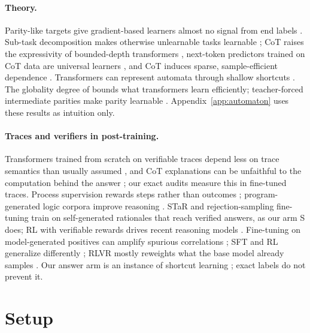 \documentclass{article}
\theoremstyle{definition}
\begin{document}
\paragraph{Theory.} Parity-like targets give gradient-based learners almost no signal from end labels \citep{shalevshwartz2017failures}. Sub-task decomposition makes otherwise unlearnable tasks learnable \citep{wies2023subtask}; CoT raises the expressivity of bounded-depth transformers \citep{feng2023towards,li2024chain,merrill2024expressive}, next-token predictors trained on CoT data are universal learners \citep{malach2024autoregressive}, and CoT induces sparse, sample-efficient dependence \citep{wen2025sparse}. Transformers can represent automata through shallow shortcuts \citep{liu2023shortcuts}. The globality degree of \citet{abbe2024far} bounds what transformers learn efficiently; teacher-forced intermediate parities make parity learnable \citep{kim2025parity}. Appendix~\ref{app:automaton} uses these results as intuition only.

\paragraph{Traces and verifiers in post-training.} Transformers trained from scratch on verifiable traces depend less on trace semantics than usually assumed \citep{valmeekam2026beyond}, and CoT explanations can be unfaithful to the computation behind the answer \citep{turpin2023unfaithful}; our exact audits measure this in fine-tuned traces. Process supervision rewards steps rather than outcomes \citep{lightman2024verify}; program-generated logic corpora improve reasoning \citep{morishita2024logic}. STaR \citep{zelikman2022star} and rejection-sampling fine-tuning \citep{yuan2023scaling} train on self-generated rationales that reach verified answers, as our arm S does; RL with verifiable rewards drives recent reasoning models \citep{lambert2024tulu,deepseek2025r1}. Fine-tuning on model-generated positives can amplify spurious correlations \citep{setlur2024rl}; SFT and RL generalize differently \citep{chu2025sft}; RLVR mostly reweights what the base model already samples \citep{yue2025rl}. Our answer arm is an instance of shortcut learning \citep{geirhos2020shortcut}; exact labels do not prevent it.

\section{Setup}
\label{sec:setup}
\end{document}
